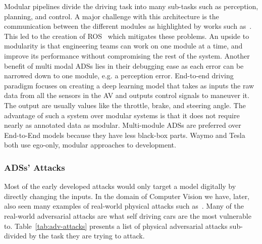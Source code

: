 \documentclass[a4paper]{article}
\begin{document}
Modular pipelines divide the driving task into many sub-tasks such as perception, planning, and control. A major challenge with this architecture is the communication between the different modules as highlighted by works such as~\cite{yang2017towards,krejsa2010high}. This led to the creation of ROS~\cite{garage2009robot} which mitigates these problems. An upside to modularity is that engineering teams can work on one module at a time, and improve its performance without compromising the rest of the system. Another benefit of multi modal ADSs lies in their debugging ease as each error can be narrowed down to one module, e.g\@. a perception error. 
End-to-end driving paradigm focuses on creating a deep learning model that takes as inputs the raw data from all the sensors in the AV and outputs control signals to maneuver it. The output are usually values like the throttle, brake, and steering angle. The advantage of such a system over modular systems is that it does not require nearly as annotated data as modular.
Multi-module ADSs are preferred over End-to-End models because they have less black-box parts. Waymo and Tesla both use ego-only, modular approaches to development.

\subsubsection{ADSs' Attacks}
Most of the early developed attacks would only target a model digitally by directly changing the inputs. In the domain of Computer Vision we have, later, also seen many examples of real-world physical attacks such as~\cite{kurakin2016, athalye2017, evtimov2017}. Many of the real-world adversarial attacks are what self driving cars are the most vulnerable to. Table~\ref{tab:adv-attacks} presents a list of physical adversarial attacks sub-divided by the task they are trying to attack.
\end{document}
